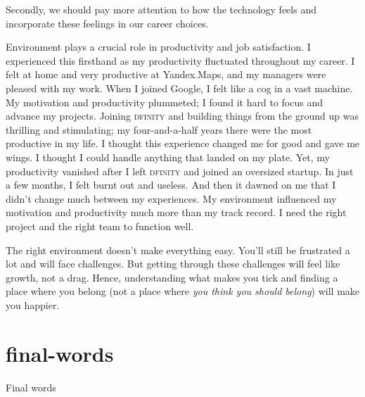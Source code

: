 \documentclass{article}
\begin{document}
\begin{figure}[medium-size]
\end{figure}

Secondly, we should pay more attention to how the technology feels and incorporate these feelings in our career choices.

Environment plays a crucial role in productivity and job satisfaction.
I experienced this firsthand as my productivity fluctuated throughout my career.
I felt at home and very productive at Yandex.Maps, and my managers were pleased with my work.
When I joined Google, I felt like a cog in a vast machine.
My motivation and productivity plummeted; I found it hard to focus and advance my projects.
Joining \textsc{dfinity} and building things from the ground up was thrilling and stimulating; my four-and-a-half years there were the most productive in my life.
I thought this experience changed me for good and gave me wings.
I thought I could handle anything that landed on my plate.
Yet, my productivity vanished after I left \textsc{dfinity} and joined an oversized startup.
In just a few months, I felt burnt out and useless.
And then it dawned on me that I didn't change much between my experiences.
My environment influenced my motivation and productivity much more than my track record.
I need the right project and the right team to function well.

The right environment doesn't make everything easy.
You'll still be frustrated a lot and will face challenges.
But getting through these challenges will feel like growth, not a drag.
Hence, understanding what makes you tick and finding a place where you belong (not a place where \emph{you think you should belong}) will make you happier.

\section{final-words}{Final words}
\end{document}
